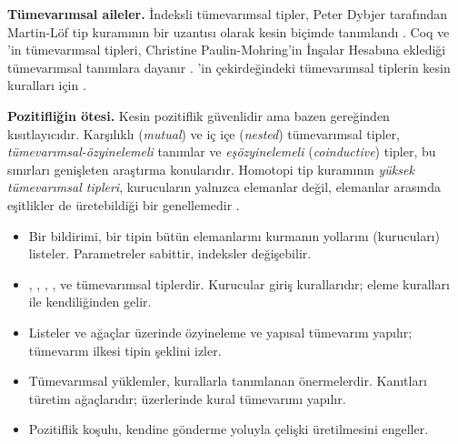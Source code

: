 \begin{arastirmanotu}
\textbf{Tümevarımsal aileler.} İndeksli tümevarımsal tipler, Peter Dybjer
tarafından Martin-Löf tip kuramının bir uzantısı olarak kesin biçimde
tanımlandı \citep{dybjer1994}. Coq ve \Lean{}'in tümevarımsal tipleri,
Christine Paulin-Mohring'in İnşalar Hesabına eklediği tümevarımsal
tanımlara dayanır \citep{paulin1993}. \Lean{}'in çekirdeğindeki
tümevarımsal tiplerin kesin kuralları için \citet{carneiro2019}.

\textbf{Pozitifliğin ötesi.} Kesin pozitiflik güvenlidir ama bazen
gereğinden kısıtlayıcıdır. Karşılıklı (\emph{mutual}) ve iç içe
(\emph{nested}) tümevarımsal tipler, \emph{tümevarımsal-özyinelemeli}
tanımlar ve \emph{eşözyinelemeli} (\emph{coinductive}) tipler, bu
sınırları genişleten araştırma konularıdır. Homotopi tip kuramının
\emph{yüksek tümevarımsal tipleri}, kurucuların yalnızca elemanlar
değil, elemanlar arasında eşitlikler de üretebildiği bir genellemedir
\citep{hott2013}.
\end{arastirmanotu}

\begin{bolumozeti}
\begin{itemize}
  \item Bir  bildirimi, bir tipin bütün elemanlarını
        kurmanın yollarını (kurucuları) listeler. Parametreler sabittir,
        indeksler değişebilir.
  \item {}, , , ,  ve 
        tümevarımsal tiplerdir. Kurucular giriş kurallarıdır; eleme
        kuralları  ile kendiliğinden gelir.
  \item Listeler ve ağaçlar üzerinde özyineleme ve yapısal tümevarım
        yapılır; tümevarım ilkesi tipin şeklini izler.
  \item Tümevarımsal yüklemler, kurallarla tanımlanan önermelerdir.
        Kanıtları türetim ağaçlarıdır; üzerlerinde kural tümevarımı
        yapılır.
  \item Pozitiflik koşulu, kendine gönderme yoluyla çelişki üretilmesini
        engeller.
\end{itemize}
\end{bolumozeti}

